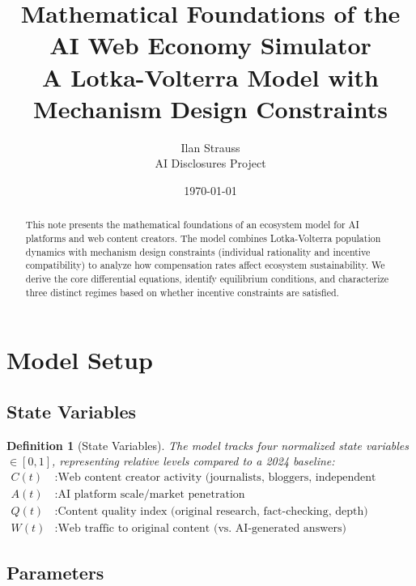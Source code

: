 \documentclass[11pt,a4paper]{article}
\title{Mathematical Foundations of the AI Web Economy Simulator\\[0.5em]\large A Lotka-Volterra Model with Mechanism Design Constraints}
\author{Ilan Strauss\\[0.5em]\small AI Disclosures Project}
\date{\today}
\newtheorem{definition}{Definition}
\begin{document}
\maketitle

\begin{abstract}
This note presents the mathematical foundations of an ecosystem model for AI platforms and web content creators. The model combines Lotka-Volterra population dynamics with mechanism design constraints (individual rationality and incentive compatibility) to analyze how compensation rates affect ecosystem sustainability. We derive the core differential equations, identify equilibrium conditions, and characterize three distinct regimes based on whether incentive constraints are satisfied.
\end{abstract}

\section{Model Setup}

\subsection{State Variables}

\begin{definition}[State Variables]
The model tracks four normalized state variables $\in [0,1]$, representing relative levels compared to a 2024 baseline:
\begin{align}
C(t) &: \text{Web content creator activity (journalists, bloggers, independent publishers)}\\
A(t) &: \text{AI platform scale/market penetration}\\
Q(t) &: \text{Content quality index (original research, fact-checking, depth)}\\
W(t) &: \text{Web traffic to original content (vs. AI-generated answers)}
\end{align}
\end{definition}

\subsection{Parameters}
\end{document}
